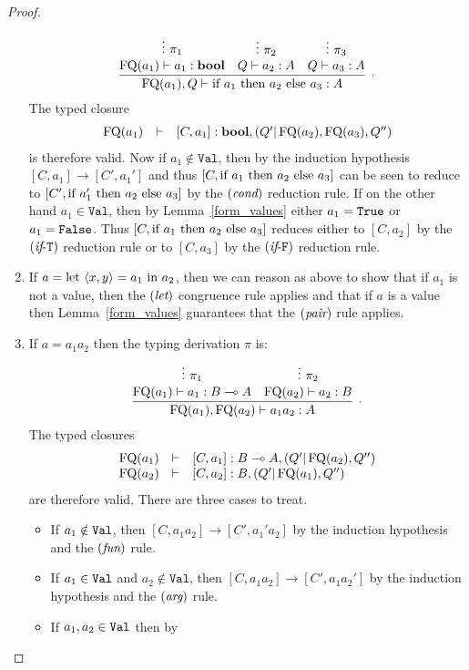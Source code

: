 \documentclass[twoside]{article}
\begin{document}
\begin{proof}
\begin{enumerate}
  \[
  \infer[.]{\FQ(a_1),Q\entails \ifthenelse{a_1}{a_2}{a_3}:A}{
    \deduce[]{\FQ(a_1)\entails a_1:\bool }{
      \vdots~\pi_1
    }
    &
    \deduce[]{Q \entails a_2:A}{
      \vdots~\pi_2
    }    
    &
    \deduce[]{Q \entails a_3:A}{
      \vdots~\pi_3
    }    
  }
  \]  
  The typed closure
  \[
  \begin{array}{rcl}
  \mathop{\textrm{FQ}}\nolimits(a_1) & \vdash & [C,a_1]:\textrm{\bf bool},(Q'|\mathop{\textrm{FQ}}\nolimits(a_2),\mathop{\textrm{FQ}}\nolimits(a_3),Q'')
  \end{array}
  \]
  is therefore valid. Now if $a_1\notin\mathtt{Val}$, then by the induction hypothesis 
  $[C,a_1]\to[C',a_1']$ and thus $[C,\textrm{\rm if}~ a_1 ~\textrm{\rm then}~ a_2 ~\textrm{\rm else}~ a_3]$ can
  be seen to reduce
  to $[C',\textrm{\rm if}~ a_1' ~\textrm{\rm then}~ a_2 ~\textrm{\rm else}~ a_3]$ by the $(\textit{cond})$ reduction rule. 
  If on the other hand $a_1\in\mathtt{Val}$, then by 
  Lemma~\hyperref[form_values]{\ref*{form_values}} either $a_1=\texttt{True}$ or $a_1=\texttt{False}$. 
  Thus $[C,\textrm{\rm if}~ a_1 ~\textrm{\rm then}~ a_2 ~\textrm{\rm else}~ a_3]$ reduces either to $[C,a_2]$ by the 
  $(\textit{if}\mbox{-}\mathtt{T})$ reduction rule or 
  to $[C,a_3]$ by the $(\textit{if}\mbox{-}\mathtt{F})$ reduction rule.
  \item If $a=\textrm{\rm let}~ \langle x,y\rangle = a_1 ~\textrm{\rm in}~ a_2$, then we can reason as above to show that 
  if $a_1$ is not a value, then the $(\textit{let})$ congruence rule applies and that if 
  $a$ is a value then Lemma~\hyperref[form_values]{\ref*{form_values}} 
  guarantees that the $(\textit{pair})$ rule applies.
  \item If $a=a_1a_2$ then the typing derivation $\pi$ is: 
  \[
    \infer[.]{\FQ(a_1),\FQ(a_2)\entails a_1a_2:A}{
      \deduce[]{\FQ(a_1)\entails a_1:B\loli A}{
        \vdots~\pi_1
      }
      &
      \deduce[]{\FQ(a_2)\entails a_2:B}{
        \vdots~\pi_2
      }      
    }
  \]  
  The typed closures
  \[
  \begin{array}{rcl}
  \mathop{\textrm{FQ}}\nolimits(a_1) & \vdash & [C,a_1]:B\multimap A,(Q'|\mathop{\textrm{FQ}}\nolimits(a_2),Q'')\\
  \mathop{\textrm{FQ}}\nolimits(a_2) & \vdash & [C,a_2]:B, (Q'|\mathop{\textrm{FQ}}\nolimits(a_1),Q'')
  \end{array}
  \]
  are therefore valid. There are three cases to treat.
  \begin{itemize}
    \item If $a_1\notin\texttt{Val}$, then $[C,a_1a_2]\to[C',a_1'a_2]$
    by the induction hypothesis and the $(\textit{fun})$ rule.
    \item If $a_1\in\texttt{Val}$ and $a_2\notin\mathtt{Val}$, then 
    $[C,a_1a_2]\to[C',a_1a_2']$ by the induction hypothesis and 
    the $(\textit{arg})$ rule.
    \item If $a_1,a_2\in\texttt{Val}$ then by 

\end{itemize}
\end{enumerate}
\end{proof}
\end{document}
